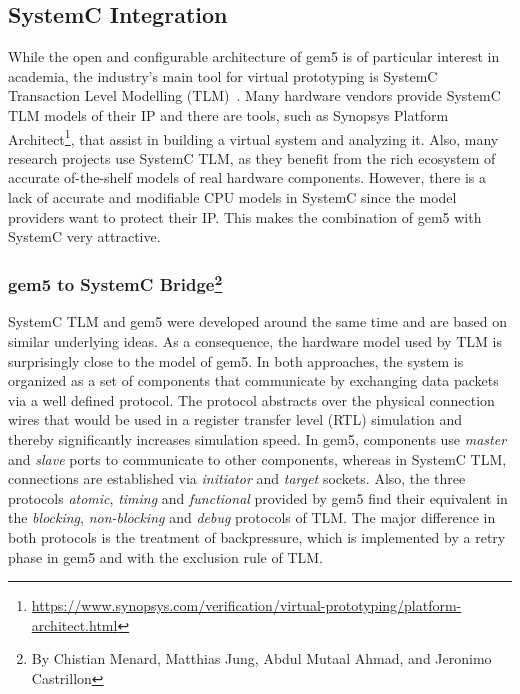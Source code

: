 \subsection[SystemC Integration]{SystemC Integration}

While the open and configurable architecture of gem5 is of particular interest
in academia, the industry's main tool for virtual prototyping is SystemC
Transaction Level Modelling (TLM)~\cite{systemc_ieee11}. Many hardware vendors
provide SystemC TLM models of their IP and there are tools, such as Synopsys
Platform Architect\footnote{\url{https://www.synopsys.com/verification/virtual-prototyping/platform-architect.html}},
that assist in building a virtual system and analyzing it. Also, many research
projects use SystemC TLM, as they benefit from the rich ecosystem of accurate
of-the-shelf models of real hardware components. However, there is a lack of
accurate and modifiable CPU models in SystemC since the model providers want to
protect their IP. This makes the combination of gem5 with SystemC very
attractive.

\subsubsection[gem5 to SystemC Bridge]{gem5 to SystemC Bridge\footnote{By Chistian Menard, Matthias Jung, Abdul Mutaal Ahmad, and Jeronimo Castrillon}}

SystemC TLM and gem5 were developed around the same time and are based on
similar underlying ideas. As a consequence, the hardware model used by TLM is
surprisingly close to the model of gem5. In both approaches, the system is
organized as a set of components that communicate by exchanging data packets
via a well defined protocol. The protocol abstracts over the physical
connection wires that would be used in a register transfer level (RTL)
simulation and thereby significantly increases simulation speed. In gem5,
components use \emph{master} and \emph{slave} ports to communicate to other
components, whereas in SystemC TLM, connections are established via
\emph{initiator} and \emph{target} sockets. Also, the three protocols
\emph{atomic}, \emph{timing} and \emph{functional} provided by gem5 find their
equivalent in the \emph{blocking}, \emph{non-blocking} and \emph{debug}
protocols of TLM. The major difference in both protocols is the treatment of
backpressure, which is implemented by a retry phase in gem5 and with the
exclusion rule of TLM.

